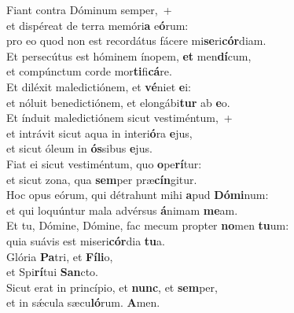 \evenverse Fiant contra Dóminum semper,~+\\\evenverse  et dispéreat de terra memóri\textbf{a} e\textbf{ó}rum:~\*\\
\evenverse pro eo quod non est recordátus fácere mi\textbf{se}ri\textbf{cór}diam.\\
\oddverse Et persecútus est hóminem ínopem, \textbf{et} men\textbf{dí}cum,~\*\\
\oddverse et compúnctum corde mor\textbf{ti}fi\textbf{cá}re.\\
\evenverse Et diléxit maledictiónem, et \textbf{vé}niet \textbf{e}i:~\*\\
\evenverse et nóluit benedictiónem, et elongábi\textbf{tur} ab \textbf{e}o.\\
\oddverse Et índuit maledictiónem sicut vestiméntum,~+\\
\oddverse  et intrávit sicut aqua in interi\textbf{ó}ra \textbf{e}jus,~\*\\
\oddverse et sicut óleum in \textbf{ós}sibus \textbf{e}jus.\\
\evenverse Fiat ei sicut vestiméntum, quo \textbf{o}pe\textbf{rí}tur:~\*\\
\evenverse et sicut zona, qua \textbf{sem}per præ\textbf{cín}gitur.\\
\oddverse Hoc opus eórum, qui détrahunt mihi \textbf{a}pud \textbf{Dó}\textbf{mi}num:~\*\\
\oddverse et qui loquúntur mala advérsus \textbf{á}nimam \textbf{me}am.\\
\evenverse Et tu, Dómine, Dómine, fac mecum propter \textbf{no}men \textbf{tu}um:~\*\\
\evenverse quia suávis est miseri\textbf{cór}dia \textbf{tu}a.\\
\oddverse Glória \textbf{Pa}tri, et \textbf{Fí}\textbf{li}o,~\*\\
\oddverse et Spi\textbf{rí}tui \textbf{San}cto.\\
\evenverse Sicut erat in princípio, et \textbf{nunc}, et \textbf{sem}per,~\*\\
\evenverse et in sǽcula sæcu\textbf{ló}rum. \textbf{A}men.\\
